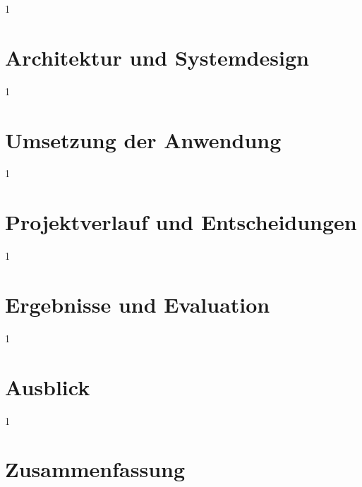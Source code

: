 \documentclass[12pt,a4paper,titlepage,listof=totoc,bibliography=totoc,chapteratlists=0pt]{scrreprt}
\begin{document}
\begin{spacing}{1}
\chapter{Architektur und Systemdesign}\label{chapter:apis}
\end{spacing}


\begin{spacing}{1}
\chapter{Umsetzung der Anwendung}\label{chapter:architecture}
\end{spacing}


\begin{spacing}{1}
\chapter{Projektverlauf und Entscheidungen}\label{chapter:project}
\end{spacing}


\begin{spacing}{1}
\chapter{Ergebnisse und Evaluation}\label{chapter:results}
\end{spacing}


\begin{spacing}{1}
\chapter{Ausblick}\label{chapter:Ausblick}
\end{spacing}



\begin{spacing}{1}
\chapter{Zusammenfassung}\label{chapter:summary}
\end{spacing}


\newpage
{}
\setcounter{page}{\value{RPages}}
{
	
}
{
	
}

\listoffigures
\end{document}
